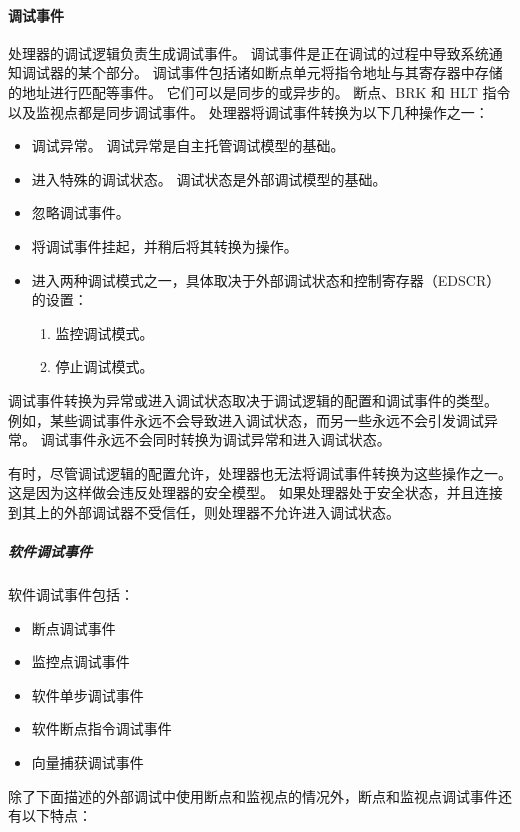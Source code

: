 \paragraph*{调试事件}

处理器的调试逻辑负责生成调试事件。
调试事件是正在调试的过程中导致系统通知调试器的某个部分。
调试事件包括诸如断点单元将指令地址与其寄存器中存储的地址进行匹配等事件。
它们可以是同步的或异步的。
断点、BRK 和 HLT 指令以及监视点都是同步调试事件。
处理器将调试事件转换为以下几种操作之一：

\begin{itemize}
\item
  调试异常。
  调试异常是自主托管调试模型的基础。
\item
  进入特殊的调试状态。
  调试状态是外部调试模型的基础。
\item
  忽略调试事件。
\item
  将调试事件挂起，并稍后将其转换为操作。
\item
  进入两种调试模式之一，具体取决于外部调试状态和控制寄存器（EDSCR）的设置：

  \begin{enumerate}
  \item
    监控调试模式。
  \item
    停止调试模式。
  \end{enumerate}
\end{itemize}

调试事件转换为异常或进入调试状态取决于调试逻辑的配置和调试事件的类型。
例如，某些调试事件永远不会导致进入调试状态，而另一些永远不会引发调试异常。
调试事件永远不会同时转换为调试异常和进入调试状态。

有时，尽管调试逻辑的配置允许，处理器也无法将调试事件转换为这些操作之一。
这是因为这样做会违反处理器的安全模型。
如果处理器处于安全状态，并且连接到其上的外部调试器不受信任，则处理器不允许进入调试状态。

\subparagraph*{软件调试事件}

软件调试事件包括：

\begin{itemize}
  \item 断点调试事件
  \item 监控点调试事件
  \item 软件单步调试事件
  \item 软件断点指令调试事件
  \item 向量捕获调试事件
\end{itemize}

除了下面描述的外部调试中使用断点和监视点的情况外，断点和监视点调试事件还有以下特点：

